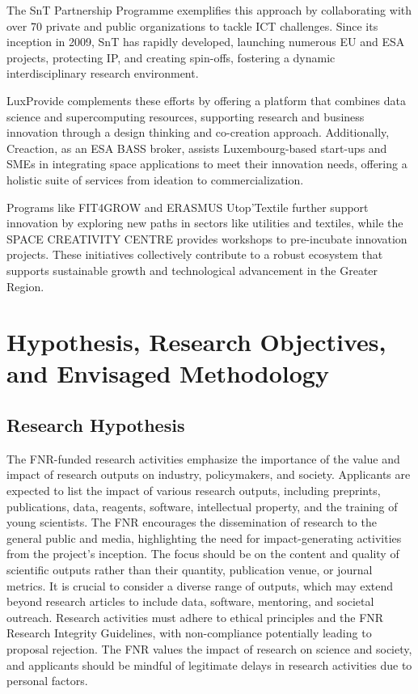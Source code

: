 \documentclass{article}
\begin{document}
The SnT Partnership Programme exemplifies this approach by collaborating with over 70 private and public organizations to tackle ICT challenges. Since its inception in 2009, SnT has rapidly developed, launching numerous EU and ESA projects, protecting IP, and creating spin-offs, fostering a dynamic interdisciplinary research environment.

LuxProvide complements these efforts by offering a platform that combines data science and supercomputing resources, supporting research and business innovation through a design thinking and co-creation approach. Additionally, Creaction, as an ESA BASS broker, assists Luxembourg-based start-ups and SMEs in integrating space applications to meet their innovation needs, offering a holistic suite of services from ideation to commercialization.

Programs like FIT4GROW and ERASMUS Utop’Textile further support innovation by exploring new paths in sectors like utilities and textiles, while the SPACE CREATIVITY CENTRE provides workshops to pre-incubate innovation projects. These initiatives collectively contribute to a robust ecosystem that supports sustainable growth and technological advancement in the Greater Region.

\section{Hypothesis, Research Objectives, and Envisaged Methodology}

\subsection{Research Hypothesis}

The FNR-funded research activities emphasize the importance of the value and impact of research outputs on industry, policymakers, and society. Applicants are expected to list the impact of various research outputs, including preprints, publications, data, reagents, software, intellectual property, and the training of young scientists. The FNR encourages the dissemination of research to the general public and media, highlighting the need for impact-generating activities from the project's inception. The focus should be on the content and quality of scientific outputs rather than their quantity, publication venue, or journal metrics. It is crucial to consider a diverse range of outputs, which may extend beyond research articles to include data, software, mentoring, and societal outreach. Research activities must adhere to ethical principles and the FNR Research Integrity Guidelines, with non-compliance potentially leading to proposal rejection. The FNR values the impact of research on science and society, and applicants should be mindful of legitimate delays in research activities due to personal factors.
\end{document}
